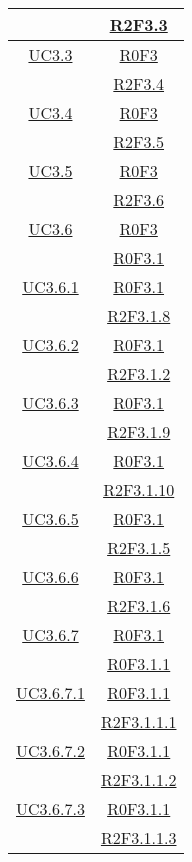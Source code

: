 \begin{longtable}{|c|c|}
& \hyperlink{R2F3.3}{R2F3.3}\\
\hline
\hyperlink{UC3.3}{UC3.3} & \hyperlink{R0F3}{R0F3}\\
& \hyperlink{R2F3.4}{R2F3.4}\\
\hline
\hyperlink{UC3.4}{UC3.4} & \hyperlink{R0F3}{R0F3}\\
& \hyperlink{R2F3.5}{R2F3.5}\\
\hline
\hyperlink{UC3.5}{UC3.5} & \hyperlink{R0F3}{R0F3}\\
& \hyperlink{R2F3.6}{R2F3.6}\\
\hline
\hyperlink{UC3.6}{UC3.6} & \hyperlink{R0F3}{R0F3}\\
& \hyperlink{R0F3.1}{R0F3.1}\\
\hline
\hyperlink{UC3.6.1}{UC3.6.1} & \hyperlink{R0F3.1}{R0F3.1}\\
& \hyperlink{R2F3.1.8}{R2F3.1.8}\\
\hline
\hyperlink{UC3.6.2}{UC3.6.2} & \hyperlink{R0F3.1}{R0F3.1}\\
& \hyperlink{R2F3.1.2}{R2F3.1.2}\\
\hline
\hyperlink{UC3.6.3}{UC3.6.3} & \hyperlink{R0F3.1}{R0F3.1}\\
& \hyperlink{R2F3.1.9}{R2F3.1.9}\\
\hline
\hyperlink{UC3.6.4}{UC3.6.4} & \hyperlink{R0F3.1}{R0F3.1}\\
& \hyperlink{R2F3.1.10}{R2F3.1.10}\\
\hline
\hyperlink{UC3.6.5}{UC3.6.5} & \hyperlink{R0F3.1}{R0F3.1}\\
& \hyperlink{R2F3.1.5}{R2F3.1.5}\\
\hline
\hyperlink{UC3.6.6}{UC3.6.6} & \hyperlink{R0F3.1}{R0F3.1}\\
& \hyperlink{R2F3.1.6}{R2F3.1.6}\\
\hline
\hyperlink{UC3.6.7}{UC3.6.7} & \hyperlink{R0F3.1}{R0F3.1}\\
& \hyperlink{R0F3.1.1}{R0F3.1.1}\\
\hline
\hyperlink{UC3.6.7.1}{UC3.6.7.1} & \hyperlink{R0F3.1.1}{R0F3.1.1}\\
& \hyperlink{R2F3.1.1.1}{R2F3.1.1.1}\\
\hline
\hyperlink{UC3.6.7.2}{UC3.6.7.2} & \hyperlink{R0F3.1.1}{R0F3.1.1}\\
& \hyperlink{R2F3.1.1.2}{R2F3.1.1.2}\\
\hline
\hyperlink{UC3.6.7.3}{UC3.6.7.3} & \hyperlink{R0F3.1.1}{R0F3.1.1}\\
& \hyperlink{R2F3.1.1.3}{R2F3.1.1.3}\\

\end{longtable}
